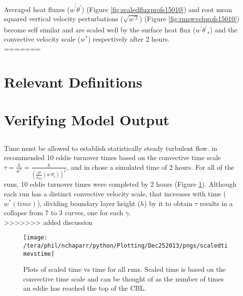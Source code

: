 Averaged heat fluxes ($\overline{w^{'}\theta^{'}}$) (Figure \ref{fig:scaledfluxprofs15010}) and 
root mean squared vertical velocity perturbations ($\sqrt{w^{'2}}$) (Figure \ref{fig:rmswvelprofs15010})
become self similar and are scaled well by the surface heat flux ($\overline{w^{'}\theta^{'}}_{s}$) 
and the convective velocity scale ($w^{*}$) respectively after 2 hours.\\
=======

\section{Relevant Definitions}


\section{Verifying Model Output}
\label{sec:CheckingtheModel}
\subsection{}%
\FloatBarrier

Time must be allowed to establish statistically steady turbulent flow.  \citeauthor{SullMoengStev} in \cite{SullMoengStev}
recommended 10 eddie turnover times based on the convective time scale $\tau = \frac{h}{w^{*}} = \frac{h}{ \left( \frac{gh}{\overline{\theta}_{ML}}(\overline{w^{,} \theta^{,}_{s}}) \right)^{\frac{1}{3}} } $, 
and \citeauthor{BrooksFowler2} in \cite{BrooksFowler2} chose a simulated time of 2 hours.  For all of the runs, 10 eddie 
turnover times were completed by 2 hours (Figure \ref{fig:ScaledTimevsTime}).  Although each run has a distinct
convective velocity scale, that increases with time ($w^{*}(time)$), dividing boundary layer height ($h$) by it
to obtain $\tau$ results in a collapse from 7 to 3 curves, one for each $\gamma$.\\
>>>>>>> added discussion


\begin{figure}[!h]
    \centering
    \texttt{[image: /tera/phil/nchaparr/python/Plotting/Dec252013/pngs/scaledtimevstime]}
    \caption{Plots of scaled time vs time for all runs.  Scaled time is based on the convective time scale 
    and can be thought of as the number of times an eddie has reached the top of the CBL. }
    \label{fig:ScaledTimevsTime}   
\end{figure}

